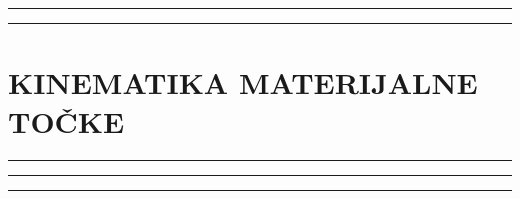 \documentclass[10pt]{book}
\newcounter{zadatak} %
\newcounter{cjelina}
\begin{document}
{\color{boja} \rule{\linewidth}{0.3mm} }




{\color{boja} \rule{\linewidth}{0.3mm} }


\setcounter{zadatak}{0}

\section{KINEMATIKA MATERIJALNE TOČKE}

{\color{boja} \rule{\linewidth}{0.3mm} }


{\color{boja} \rule{\linewidth}{0.3mm} }


{\color{boja} \rule{\linewidth}{0.3mm} }



\setcounter{zadatak}{0}






%

%

\end{document}

